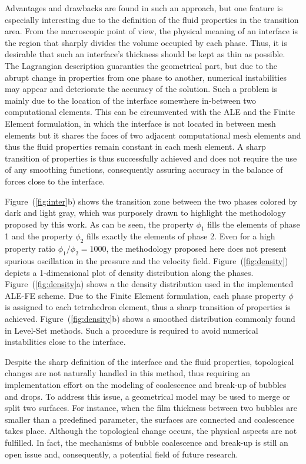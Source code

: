 \documentclass[a4paper,portuges]{article}
\begin{document}
Advantages and drawbacks are found in such an approach, but one feature
is especially interesting due to the definition of the fluid properties
in the transition area. From the macroscopic point of view, the physical
meaning of an interface is the region that sharply divides the volume
occupied by each phase. Thus, it is desirable that such an interface's
thickness should be kept as thin as possible. The Lagrangian description
guaranties the geometrical part, but due to the abrupt change in
properties from one phase to another, numerical instabilities may appear
and deteriorate the accuracy of the solution. Such a problem is mainly
due to the location of the interface somewhere in-between two
computational elements. This can be circumvented with the ALE and the
Finite Element formulation, in which the interface is not located in
between mesh elements but it shares the faces of two adjacent
computational mesh elements and thus the fluid properties remain
constant in each mesh element. A sharp transition of properties is thus
successfully achieved and does not require the use of any smoothing
functions, consequently assuring accuracy in the balance of forces close
to the interface. 

Figure~(\ref{fig:inter}b) shows the transition zone between the two
phases colored by dark and light gray, which was purposely drawn to
highlight the methodology proposed by this work. As can be seen, the
property $\phi_1$ fills the elements of phase 1 and the property
$\phi_2$ fills exactly the elements of phase 2. Even for a high property
ratio $\phi_1 / \phi_2 = 1000$, the methodology proposed here does not
present spurious oscillation in the pressure and the velocity field.
Figure~(\ref{fig:density}) depicts a 1-dimensional plot of density
distribution along the phases. Figure~(\ref{fig:density}a) shows a the
density distribution used in the implemented ALE-FE scheme. Due to the
Finite Element formulation, each phase property $\phi$ is assigned to
each tetrahedron element, thus a sharp transition of properties is
achieved. Figure~(\ref{fig:density}b) shows a smoothed distribution
commonly found in Level-Set methods. Such a procedure is required to
avoid numerical instabilities close to the interface.

Despite the sharp definition of the interface and the fluid properties,
topological changes are not naturally handled in this method, thus
requiring an implementation effort on the modeling of coalescence and
break-up of bubbles and drops. To address this issue, a geometrical
model may be used to merge or split two surfaces. For instance, when the
film thickness between two bubbles are smaller than a predefined
parameter, the surfaces are connected and coalescence takes place.
Although the topological change occurs, the physical aspects are not
fulfilled. In fact, the mechanisms of bubble coalescence and break-up is
still an open issue and, consequently, a potential field of future
research. 
\end{document}
